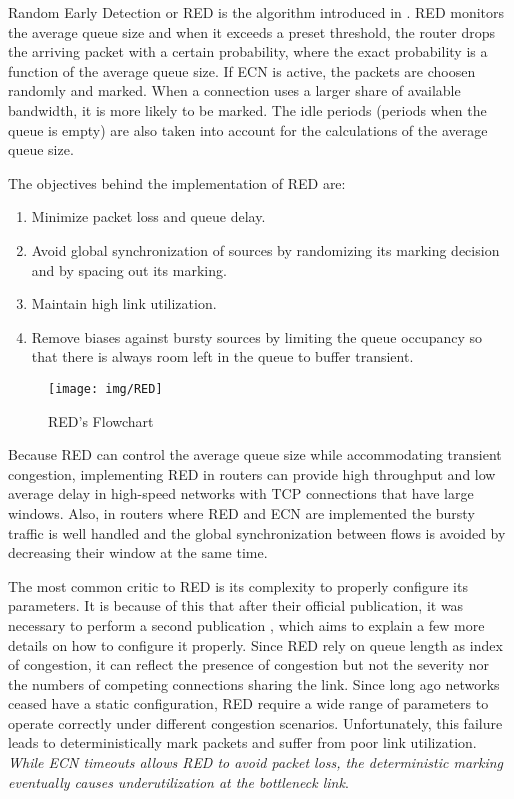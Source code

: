 Random Early Detection or RED is the algorithm introduced in
\cite{FloydJacobsonRED}. RED monitors the average queue size and when it
exceeds a preset threshold, the router drops the arriving packet with a
certain probability, where the exact probability is a function of the average
queue size. If \gls{ECN} is active, the packets are choosen randomly and marked. When
a connection uses a larger share of available bandwidth, it is more likely to
be marked. The idle periods (periods when the queue is empty) are also taken
into account for the calculations of the average queue size.

The objectives behind the  implementation of RED are:
\begin{enumerate}
\item Minimize packet loss and queue delay.
\item Avoid global synchronization of sources by randomizing its marking
decision and by spacing out its marking.
\item Maintain high link utilization.
\item Remove biases against bursty sources by limiting the queue occupancy so
that there is always room left in the queue to buffer transient.
\end{enumerate}

\begin{wrapfigure}{r}{0.5\textwidth}
  \begin{center}
    \texttt{[image: img/RED]}
  \end{center}
  \caption{RED's Flowchart}
  \label{fig:RED}
\end{wrapfigure}

Because RED can control the average queue size while accommodating transient
congestion, implementing RED in routers can provide high throughput and low
average delay in high-speed networks with TCP connections that have large
windows. Also, in routers where RED and ECN are implemented the bursty traffic
is well handled and the global synchronization between flows is avoided by
decreasing their window at the same time.

The most common critic to RED is its complexity to properly configure its
parameters. It is because of this that after their official publication, it
was necessary to perform a second publication \cite{NotesRED}, which aims to
explain a few more details on how to configure it properly. Since RED rely on
queue length as index of congestion, it can reflect the presence of congestion
but not the severity nor the numbers of competing connections sharing the
link. Since long ago networks ceased have a static configuration, RED require
a wide range of parameters to operate correctly under different congestion
scenarios. Unfortunately, this failure leads to deterministically mark packets
and suffer from poor link utilization. \textit{While  ECN timeouts allows RED
to avoid packet loss, the deterministic marking eventually causes
underutilization at the bottleneck link}\cite{FengBLUEAQM}.

